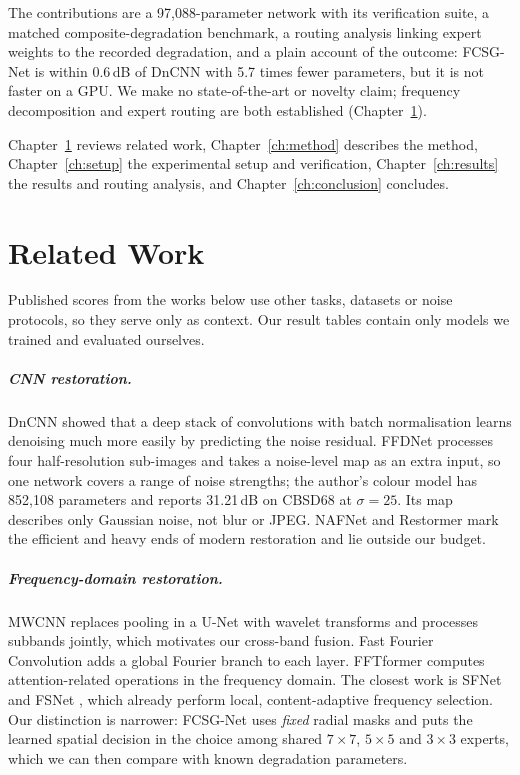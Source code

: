 \documentclass[12pt,a4paper,oneside]{NITR}
\newcommand{\fcsg}{FCSG-Net}
\newcommand{\dB}{\,dB}
\begin{document}
The contributions are a 97,088-parameter network with its verification
suite, a matched composite-degradation benchmark, a routing analysis linking
expert weights to the recorded degradation, and a plain account of the
outcome: \fcsg{} is within 0.6\dB{} of DnCNN with 5.7 times fewer parameters,
but it is not faster on a GPU. We make no state-of-the-art or novelty claim;
frequency decomposition and expert routing are both established
(Chapter~\ref{ch:literature}).

Chapter~\ref{ch:literature} reviews related work, Chapter~\ref{ch:method}
describes the method, Chapter~\ref{ch:setup} the experimental setup and
verification, Chapter~\ref{ch:results} the results and routing analysis, and
Chapter~\ref{ch:conclusion} concludes.


\chapter{Related Work}\label{ch:literature}

Published scores from the works below use other tasks, datasets or noise
protocols, so they serve only as context. Our result tables contain only
models we trained and evaluated ourselves.

\paragraph{CNN restoration.} DnCNN \cite{zhang2017dncnn} showed that a deep
stack of convolutions with batch normalisation learns denoising much more
easily by predicting the noise residual. FFDNet \cite{zhang2018ffdnet}
processes four half-resolution sub-images and takes a noise-level map as an
extra input, so one network covers a range of noise strengths; the author's
colour model \cite{kair} has 852,108 parameters and reports 31.21\dB{} on
CBSD68 at $\sigma=25$. Its map describes only Gaussian noise, not blur or
JPEG. NAFNet \cite{chen2022nafnet} and Restormer \cite{zamir2022restormer}
mark the efficient and heavy ends of modern restoration and lie outside our
budget.

\paragraph{Frequency-domain restoration.} MWCNN \cite{liu2018mwcnn} replaces
pooling in a U-Net with wavelet transforms and processes subbands jointly,
which motivates our cross-band fusion. Fast Fourier Convolution
\cite{chi2020ffc} adds a global Fourier branch to each layer. FFTformer
\cite{kong2023fftformer} computes attention-related operations in the
frequency domain. The closest work is SFNet \cite{cui2023sfnet} and FSNet
\cite{cui2024fsnet}, which already perform local, content-adaptive frequency
selection. Our distinction is narrower: \fcsg{} uses \emph{fixed} radial
masks and puts the learned spatial decision in the choice among shared
$7\times7$, $5\times5$ and $3\times3$ experts, which we can then compare with
known degradation parameters.
\end{document}

